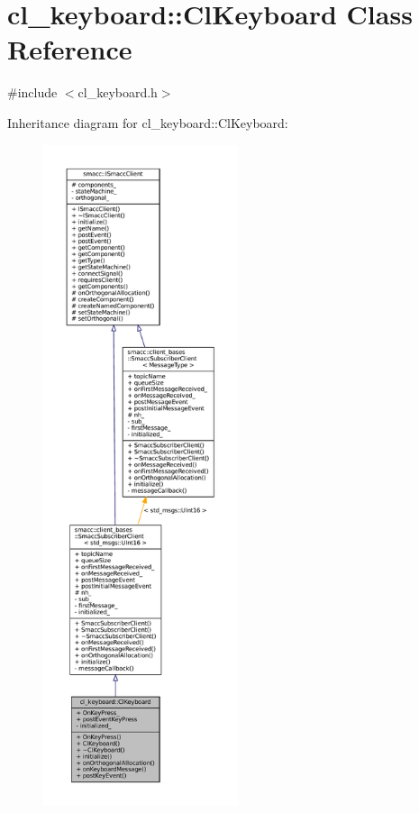 \hypertarget{classcl__keyboard_1_1ClKeyboard}{}\section{cl\+\_\+keyboard\+:\+:Cl\+Keyboard Class Reference}
\label{classcl__keyboard_1_1ClKeyboard}


{\ttfamily \#include $<$cl\+\_\+keyboard.\+h$>$}



Inheritance diagram for cl\+\_\+keyboard\+:\+:Cl\+Keyboard\+:
\nopagebreak
\begin{figure}[H]
\begin{center}
\leavevmode
\includegraphics[height=550pt]{classcl__keyboard_1_1ClKeyboard__inherit__graph}
\end{center}
\end{figure}



